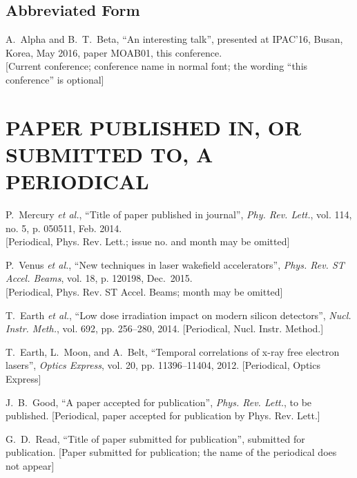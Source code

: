 \documentclass[a4paper,
              ]{jacow}
\begin{document}
\subsection{Abbreviated Form}

\begin{thebibliography}{9} %
\setcounter{enumi}{4}
	A.~Alpha and B.~T.~Beta, 
	“An interesting talk”, 
	presented at IPAC’16, 
	Busan, Korea, May 2016, 
	paper MOAB01, this conference.\\
	\textcolor{jgrepc}{[Current conference; conference name in normal font; the
		wording “this conference” is optional]}
\end{thebibliography}


\section{PAPER PUBLISHED IN, OR SUBMITTED TO, A PERIODICAL}

\begin{thebibliography}{99} %
  \setcounter{enumi}{5}
		P.~Mercury \emph{et al.}, 
		“Title of paper published in journal”,
		\emph{Phy. Rev. Lett.}, vol. 114, no. 5, 
		p. 050511, Feb. 2014. \\
	\textcolor{jblue}{[Periodical, Phys. Rev. Lett.; 
		             issue no. and month may be omitted]}

		P.~Venus \emph{et al.}, 
		“New techniques in laser wakefield accelerators”,
		\emph{Phys. Rev. ST Accel. Beams}, vol. 18, 
		p. 120198, Dec.~2015.   \\
	\textcolor{jblue}{[Periodical, Phys. Rev. ST Accel. Beams; 
			              month may be omitted]}

		T.~Earth \emph{et al.}, 
		“Low dose irradiation impact on modern silicon detectors”, 
		\emph{Nucl. Instr. Meth.}, vol. 692, pp. 256--280, 2014.
	\textcolor{jblue}{[Periodical, Nucl. Instr. Method.]}
	
		T.~Earth, L.~Moon, and A.~Belt, 
		“Temporal correlations of x-ray free electron lasers”, 
		\emph{Optics Express}, vol. 20, pp. 11396--11404, 2012.
	\textcolor{jblue}{[Periodical, Optics Express]}

		J.~B.~Good, 
		“A paper accepted for publication”, 
		\emph{Phys. Rev. Lett.}, to be published.
	\textcolor{jblue}{[Periodical, paper accepted for publication 
		              by Phys. Rev. Lett.]}

		G.~D.~Read, 
		“Title of paper submitted for publication”,
		submitted for publication.
	\textcolor{jblue}{[Paper submitted for publication; the name of the 
					  periodical does not appear]}
\end{thebibliography}
\end{document}
